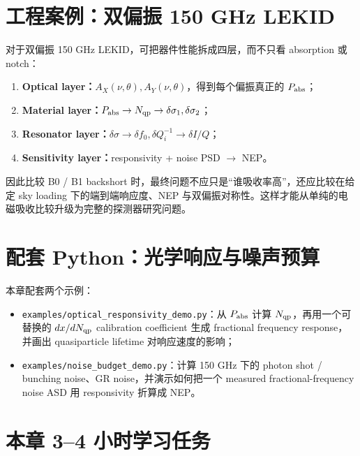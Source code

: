 \documentclass[11pt,a4paper,openany]{ctexrep}
\begin{document}
\section{工程案例：双偏振 150 GHz LEKID}

\begin{projectbox}
对于双偏振 150 GHz LEKID，可把器件性能拆成四层，而不只看 absorption 或 notch：
\begin{enumerate}
  \item \textbf{Optical layer：}$A_X(\nu,\theta),A_Y(\nu,\theta)$，得到每个偏振真正的 $P_{\rm abs}$；
  \item \textbf{Material layer：}$P_{\rm abs}\rightarrow N_{\rm qp}\rightarrow\delta\sigma_1,\delta\sigma_2$；
  \item \textbf{Resonator layer：}$\delta\sigma\rightarrow\delta f_0,\delta Q_i^{-1}\rightarrow\delta I/Q$；
  \item \textbf{Sensitivity layer：}responsivity + noise PSD $\rightarrow$ NEP。
\end{enumerate}
因此比较 B0 / B1 backshort 时，最终问题不应只是“谁吸收率高”，还应比较在给定 sky loading 下的端到端响应度、NEP 与双偏振对称性。这样才能从单纯的电磁吸收比较升级为完整的探测器研究问题。
\end{projectbox}

\section{配套 Python：光学响应与噪声预算}

本章配套两个示例：
\begin{itemize}
  \item \texttt{examples/optical\_responsivity\_demo.py}：从 $P_{\rm abs}$ 计算 $N_{\rm qp}$，再用一个可替换的 $dx/dN_{\rm qp}$ calibration coefficient 生成 fractional frequency response，并画出 quasiparticle lifetime 对响应速度的影响；
  \item \texttt{examples/noise\_budget\_demo.py}：计算 150 GHz 下的 photon shot / bunching noise、GR noise，并演示如何把一个 measured fractional-frequency noise ASD 用 responsivity 折算成 NEP。
\end{itemize}

\section{本章 3--4 小时学习任务}
\end{document}
